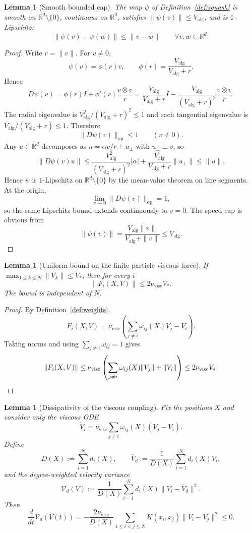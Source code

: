 \documentclass[11pt]{article}
\newtheorem{lemma}[theorem]{Lemma}
\theoremstyle{definition}
\theoremstyle{remark}
\newcommand{\R}{\mathbb{R}}
\begin{document}
\begin{lemma}[Smooth bounded cap]\label{lem:squash}
The map $\psi$ of Definition~\ref{def:squash} is smooth on $\R^d\setminus\{0\}$,
continuous on $\R^d$, satisfies $\|\psi(v)\|\leq V_{\mathrm{alg}}$, and is
$1$-Lipschitz:
\[
\|\psi(v)-\psi(w)\|\leq \|v-w\|
\qquad
\forall v,w\in\R^d.
\]
\end{lemma}

\begin{proof}
Write $r=\|v\|$. For $v\neq0$,
\[
\psi(v)=\phi(r)v,
\qquad
\phi(r)=\frac{V_{\mathrm{alg}}}{V_{\mathrm{alg}}+r}.
\]
Hence
\[
D\psi(v)
=
\phi(r)I
+\phi'(r)\frac{v\otimes v}{r}
=
\frac{V_{\mathrm{alg}}}{V_{\mathrm{alg}}+r}I
-\frac{V_{\mathrm{alg}}}{(V_{\mathrm{alg}}+r)^2}\frac{v\otimes v}{r}.
\]
The radial eigenvalue is
$V_{\mathrm{alg}}^2/(V_{\mathrm{alg}}+r)^2\leq1$ and each tangential eigenvalue
is $V_{\mathrm{alg}}/(V_{\mathrm{alg}}+r)\leq1$. Therefore
\[
\|D\psi(v)\|_{\mathrm{op}}\leq1\qquad (v\neq0).
\]
Any \(u\in\R^d\) decomposes as \(u=\alpha v/r+u_\perp\) with \(u_\perp\perp v\),
so
\[
\|D\psi(v)u\|
\leq
\frac{V_{\mathrm{alg}}^2}{(V_{\mathrm{alg}}+r)^2}|\alpha|+\frac{V_{\mathrm{alg}}}{V_{\mathrm{alg}}+r}\|u_\perp\|
\leq\|u\|.
\]
Hence \(\psi\) is \(1\)-Lipschitz on \(\R^d\setminus\{0\}\) by the mean-value theorem
on line segments. At the origin,
\[
\lim_{v\to0}\|D\psi(v)\|_{\mathrm{op}}=1,
\]
so the same Lipschitz bound extends continuously to \(v=0\).
The speed cap is obvious from
\[
\|\psi(v)\|=\frac{V_{\mathrm{alg}}\|v\|}{V_{\mathrm{alg}}+\|v\|}
\leq V_{\mathrm{alg}}.
\]
\qedhere
\end{proof}

\begin{lemma}[Uniform bound on the finite-particle viscous force]\label{lem:visc-bound}
If $\max_{1\leq k\leq N}\|V_k\|\leq V_*$, then for every $i$
\[
\|F_i(X,V)\|
\leq 2\nu_{\mathrm{visc}}V_*.
\]
The bound is independent of $N$.
\end{lemma}

\begin{proof}
By Definition~\ref{def:weights},
\[
F_i(X,V)
=
\nu_{\mathrm{visc}}
\left(\sum_{j\neq i}\omega_{ij}(X)V_j-V_i\right).
\]
Taking norms and using $\sum_{j\neq i}\omega_{ij}=1$ gives
\[
\|F_i(X,V)\|
\leq
\nu_{\mathrm{visc}}
\left(\sum_{j\neq i}\omega_{ij}(X)\|V_j\|+\|V_i\|\right)
\leq2\nu_{\mathrm{visc}}V_*.
\qedhere
\]
\end{proof}

\begin{lemma}[Dissipativity of the viscous coupling]\label{lem:visc-diss}
Fix the positions $X$ and consider only the viscous ODE
\[
\dot V_i
=
\nu_{\mathrm{visc}}\sum_{j\neq i}\omega_{ij}(X)(V_j-V_i).
\]
Define
\[
D(X):=\sum_{i=1}^N d_i(X),
\qquad
\bar V_d:=\frac{1}{D(X)}\sum_{i=1}^N d_i(X)V_i,
\]
and the degree-weighted velocity variance
\[
\mathscr V_d(V)
:=
\frac{1}{D(X)}
\sum_{i=1}^N d_i(X)\|V_i-\bar V_d\|^2.
\]
Then
\begin{equation}\label{eq:visc-diss}
\frac{d}{dt}\mathscr V_d(V(t))
=
-\frac{2\nu_{\mathrm{visc}}}{D(X)}
\sum_{1\leq i<j\leq N}K(x_i,x_j)\|V_i-V_j\|^2
\leq0.
\end{equation}
\end{lemma}
\end{document}
